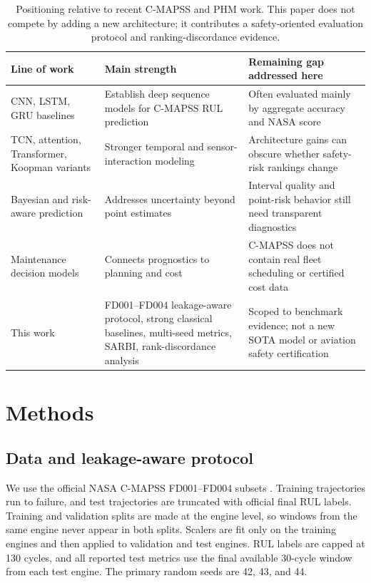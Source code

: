 \documentclass[10pt,twocolumn]{article}
\begin{document}
\begin{table}[t]
\centering
\caption{Positioning relative to recent C-MAPSS and PHM work. This paper does not compete by adding a new architecture; it contributes a safety-oriented evaluation protocol and ranking-discordance evidence.}
\label{tab:positioning}
\small
\begin{tabularx}{\textwidth}{p{}p{}X}
\toprule
Line of work & Main strength & Remaining gap addressed here \\
\midrule
CNN, LSTM, GRU baselines \citep{Babu2016,Zheng2017,Li2018} & Establish deep sequence models for C-MAPSS RUL prediction & Often evaluated mainly by aggregate accuracy and NASA score \\
TCN, attention, Transformer, Koopman variants \citep{Liu2023SAETCN,Fan2024STAR,Kim2025KoopmanTransformer} & Stronger temporal and sensor-interaction modeling & Architecture gains can obscure whether safety-risk rankings change \\
Bayesian and risk-aware prediction \citep{Hu2023Bayesian,Xiang2024BayesianGated} & Addresses uncertainty beyond point estimates & Interval quality and point-risk behavior still need transparent diagnostics \\
Maintenance decision models \citep{DePater2022,Mitici2023} & Connects prognostics to planning and cost & C-MAPSS does not contain real fleet scheduling or certified cost data \\
This work & FD001--FD004 leakage-aware protocol, strong classical baselines, multi-seed metrics, SARBI, rank-discordance analysis & Scoped to benchmark evidence; not a new SOTA model or aviation safety certification \\
\bottomrule
\end{tabularx}
\end{table}

\section{Methods}

\subsection{Data and leakage-aware protocol}

We use the official NASA C-MAPSS FD001--FD004 subsets \citep{NASA_PCoE,Saxena2008}. Training trajectories run to failure, and test trajectories are truncated with official final RUL labels. Training and validation splits are made at the engine level, so windows from the same engine never appear in both splits. Scalers are fit only on the training engines and then applied to validation and test engines. RUL labels are capped at 130 cycles, and all reported test metrics use the final available 30-cycle window from each test engine. The primary random seeds are 42, 43, and 44.
\end{document}
